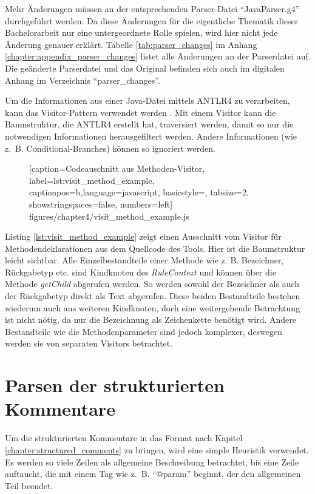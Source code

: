 Mehr Änderungen müssen an der entsprechenden Parser-Datei \enquote{JavaParser.g4} durchgeführt werden.  Da diese Änderungen für die eigentliche Thematik dieser Bachelorarbeit nur eine untergeordnete Rolle spielen, wird hier nicht jede Änderung genauer erklärt. Tabelle \ref{tab:parser_changes} im Anhang \ref{chapter:appendix_parser_changes} listet alle Änderungen an der Parserdatei auf. Die geänderte Parserdatei und das Original befinden sich auch im digitalen Anhang im Verzeichnis \enquote{parser\_changes}. 

Um die Informationen aus einer Java-Datei mittels ANTLR4 zu verarbeiten, kann das Visitor-Pattern verwendet werden \cite[S.~400ff.]{gamma2015design}. Mit einem Visitor kann die Baumstruktur, die ANTLR4 erstellt hat, traversiert werden, damit so nur die notwendigen Informationen herausgefiltert werden. Andere Informationen (wie z.~B. Conditional-Branches) können so ignoriert werden.  
		\begin{figure} [htbp!]
			
			[caption={Codeauschnitt aus  Methoden-Visitor},
			label={lst:visit_method_example},
			captionpos=b,language=javascript, basicstyle=\footnotesize, tabsize=2, showstringspaces=false,  numbers=left]
			{figures/chapter4/visit_method_example.js}
		\end{figure}
Listing \ref{lst:visit_method_example} zeigt einen Ausschnitt vom Visitor für Methodendeklarationen aus dem Quellcode des Tools. Hier ist die Baumstruktur leicht sichtbar. Alle Einzelbestandteile einer Methode wie z. B. Bezeichner, Rückgabetyp etc. sind Kindknoten des \textit{RuleContext} und können über die Methode \textit{getChild} abgerufen werden. So werden sowohl der Bezeichner als auch der Rückgabetyp direkt als Text abgerufen. Diese  beiden Bestandteile bestehen wiederum auch aus weiteren Kindknoten, doch eine weitergehende Betrachtung ist nicht nötig, da nur die Bezeichnung als Zeichenkette benötigt wird. Andere Bestandteile wie die Methodenparameter sind jedoch komplexer, deswegen werden sie von separaten Visitors betrachtet.

\section{Parsen der strukturierten Kommentare}\label{chapter:comment_parsing}
Um die strukturierten Kommentare in das Format nach Kapitel \ref{chapter:structured_comments} zu bringen, wird eine simple Heuristik verwendet. Es werden so viele Zeilen als allgemeine Beschreibung betrachtet, bis eine Zeile auftaucht, die mit einem Tag wie z.~B. \enquote{@param} beginnt, der den allgemeinen Teil beendet.


